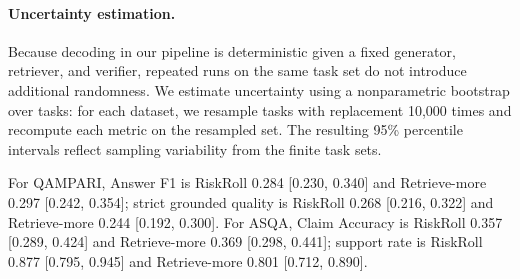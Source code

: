 
\paragraph{Uncertainty estimation.}
Because decoding in our pipeline is deterministic given a fixed generator, retriever, and verifier, repeated runs on the same task set do not introduce additional randomness. We estimate uncertainty using a nonparametric bootstrap over tasks: for each dataset, we resample tasks with replacement 10,000 times and recompute each metric on the resampled set. The resulting 95\% percentile intervals reflect sampling variability from the finite task sets.

For QAMPARI, Answer F1 is RiskRoll 0.284 [0.230, 0.340] and Retrieve-more 0.297 [0.242, 0.354]; strict grounded quality is RiskRoll 0.268 [0.216, 0.322] and Retrieve-more 0.244 [0.192, 0.300]. For ASQA, Claim Accuracy is RiskRoll 0.357 [0.289, 0.424] and Retrieve-more 0.369 [0.298, 0.441]; support rate is RiskRoll 0.877 [0.795, 0.945] and Retrieve-more 0.801 [0.712, 0.890].
